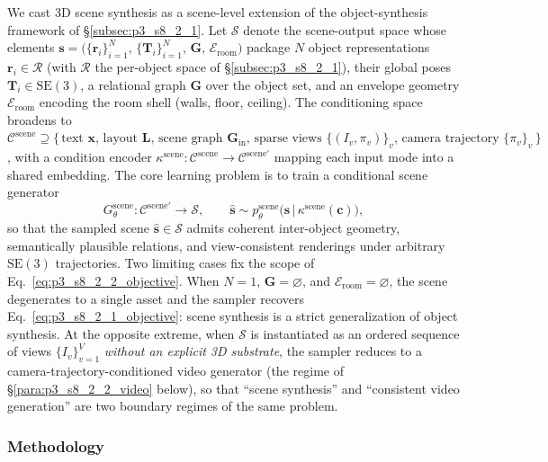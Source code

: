 We cast 3D scene synthesis as a scene-level extension of the object-synthesis framework of §\ref{subsec:p3_s8_2_1}.
Let $\mathcal{S}$ denote the scene-output space whose elements
$\mathbf{s} = \big(\{\mathbf{r}_i\}_{i=1}^N,\, \{\mathbf{T}_i\}_{i=1}^N,\, \mathbf{G},\, \mathcal{E}_{\text{room}}\big)$
package $N$ object representations $\mathbf{r}_i\!\in\!\mathcal{R}$ (with $\mathcal{R}$ the per-object space of §\ref{subsec:p3_s8_2_1}), their global poses $\mathbf{T}_i\!\in\!\mathrm{SE}(3)$, a relational graph $\mathbf{G}$ over the object set, and an envelope geometry $\mathcal{E}_{\text{room}}$ encoding the room shell (walls, floor, ceiling).
The conditioning space broadens to
$\mathcal{C}^{\text{scene}} \supseteq \{\,\text{text }\mathbf{x},\,\text{layout }\mathbf{L},\,\text{scene graph }\mathbf{G}_{\text{in}},\,\text{sparse views }\{(I_v,\pi_v)\}_v,\,\text{camera trajectory }\{\pi_v\}_v\,\}$,
with a condition encoder $\kappa^{\text{scene}}:\mathcal{C}^{\text{scene}}\!\to\!\mathcal{C}^{\text{scene}\prime}$ mapping each input mode into a shared embedding.
The core learning problem is to train a conditional scene generator
\begin{equation}
G_\theta^{\text{scene}}:\mathcal{C}^{\text{scene}\prime}\rightarrow \mathcal{S},
\qquad
\hat{\mathbf{s}}\sim p_\theta^{\text{scene}}\!\big(\mathbf{s}\,\big|\,\kappa^{\text{scene}}(\mathbf{c})\big),
\label{eq:p3_s8_2_2_objective}
\end{equation}
so that the sampled scene $\hat{\mathbf{s}}\!\in\!\mathcal{S}$ admits coherent inter-object geometry, semantically plausible relations, and view-consistent renderings under arbitrary $\mathrm{SE}(3)$ trajectories.
Two limiting cases fix the scope of Eq.~\eqref{eq:p3_s8_2_2_objective}.
When $N\!=\!1$, $\mathbf{G}\!=\!\varnothing$, and $\mathcal{E}_{\text{room}}\!=\!\varnothing$, the scene degenerates to a single asset and the sampler recovers Eq.~\eqref{eq:p3_s8_2_1_objective}: scene synthesis is a strict generalization of object synthesis.
At the opposite extreme, when $\mathcal{S}$ is instantiated as an ordered sequence of views $\{I_v\}_{v=1}^V$ \emph{without an explicit 3D substrate}, the sampler reduces to a camera-trajectory-conditioned video generator (the regime of §\ref{para:p3_s8_2_2_video} below), so that ``scene synthesis'' and ``consistent video generation'' are two boundary regimes of the same problem.


\subsubsection{Methodology}
\label{subsubsec:p3_s8_2_2_methodology}

